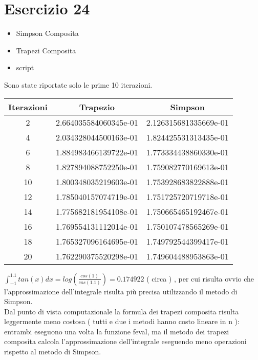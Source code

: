 \section{Esercizio 24}
\begin{itemize}
\item Simpson Composita

\item Trapezi Composita

\item script

\end{itemize}

Sono state riportate solo le prime 10 iterazioni.
\begin{table}[ht!]
	\centering
	\small
	\begin{tabular}{| c | c | c|}
	\hline
	Iterazioni & Trapezio & Simpson\\
	\hline
	2 & 2.664035584060345e-01&2.126315681335669e-01\\
	\hline
	4&2.034328044500163e-01&1.824425531313435e-01\\
	\hline
	6 &1.884983466139722e-01&1.773334438860330e-01\\
	\hline
	8&1.827894088752250e-01&1.759082770169613e-01\\
	\hline
	10&1.800348035219603e-01&1.753928683822888e-01 \\
	\hline
	12&1.785040157074719e-01&1.751725720719718e-01\\
	\hline
	14&1.775682181954108e-01&1.750665465192467e-01\\
	\hline
	16&1.769554131112014e-01&1.750107478565269e-01\\
	\hline
	18&1.765327096164695e-01&1.749792544399417e-01\\
	\hline
	20&1.762290375520298e-01&1.749604488953863e-01\\
	\hline
	\end{tabular}
\end{table}

$\int_{-1}^{1.1} tan(x)  dx = log(\frac{cos(1)}{cos(1.1)}) = 0.174922$ ( circa ) , per cui risulta ovvio che l'approssimazione dell'integrale risulta più precisa utilizzando il metodo di Simpson.\\
 Dal punto di vista computazionale la formula dei trapezi composita risulta leggermente meno costosa ( tutti e due i metodi  hanno costo lineare in n ): entrambi  eseguono una volta la funzione feval, ma il metodo dei trapezi composita calcola l'approssimazione dell'integrale eseguendo meno operazioni rispetto al metodo di Simpson.



